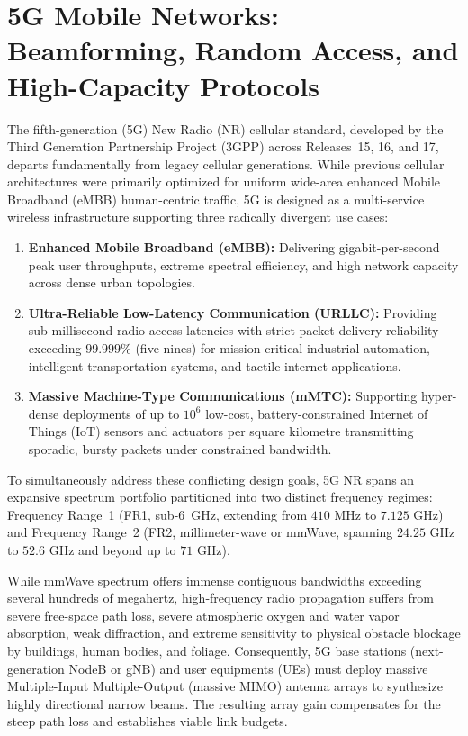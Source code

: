 \chapter{5G Mobile Networks: Beamforming, Random Access, and High-Capacity Protocols}
\label{sec:chapter4}

The fifth-generation (5G) New Radio (NR) cellular standard, developed by the Third Generation Partnership Project (3GPP) across Releases~15, 16, and 17, departs fundamentally from legacy cellular generations. While previous cellular architectures were primarily optimized for uniform wide-area enhanced Mobile Broadband (eMBB) human-centric traffic, 5G is designed as a multi-service wireless infrastructure supporting three radically divergent use cases:
\begin{enumerate}
    \item \textbf{Enhanced Mobile Broadband (eMBB):} Delivering gigabit-per-second peak user throughputs, extreme spectral efficiency, and high network capacity across dense urban topologies.
    \item \textbf{Ultra-Reliable Low-Latency Communication (URLLC):} Providing sub-millisecond radio access latencies with strict packet delivery reliability exceeding $99.999\%$ (five-nines) for mission-critical industrial automation, intelligent transportation systems, and tactile internet applications.
    \item \textbf{Massive Machine-Type Communications (mMTC):} Supporting hyper-dense deployments of up to $10^6$ low-cost, battery-constrained Internet of Things (IoT) sensors and actuators per square kilometre transmitting sporadic, bursty packets under constrained bandwidth.
\end{enumerate}

To simultaneously address these conflicting design goals, 5G NR spans an expansive spectrum portfolio partitioned into two distinct frequency regimes: Frequency Range~1 (FR1, sub-6~GHz, extending from $410\text{~MHz}$ to $7.125\text{~GHz}$) and Frequency Range~2 (FR2, millimeter-wave or mmWave, spanning $24.25\text{~GHz}$ to $52.6\text{~GHz}$ and beyond up to $71\text{~GHz}$). 

While mmWave spectrum offers immense contiguous bandwidths exceeding several hundreds of megahertz, high-frequency radio propagation suffers from severe free-space path loss, severe atmospheric oxygen and water vapor absorption, weak diffraction, and extreme sensitivity to physical obstacle blockage by buildings, human bodies, and foliage. Consequently, 5G base stations (next-generation NodeB or gNB) and user equipments (UEs) must deploy massive Multiple-Input Multiple-Output (massive MIMO) antenna arrays to synthesize highly directional narrow beams. The resulting array gain compensates for the steep path loss and establishes viable link budgets.

